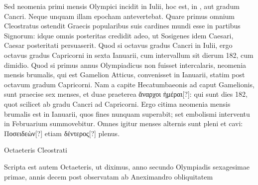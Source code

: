 Sed neomenia
primi mensis Olympici incidit in  Iulii, hoc est,
 in , aut
 gradum Cancri.
Neque unquam illam epocham antevertebat.
Quare primus omnium Cleostratus ostendit Graecis popularibus suis
cardines mundi esse in  partibus Signorum: idque omnis posteritas
credidit adeo, ut Sosigenes idem Caesari, Caesar posteritati persuaserit.
Quod si octavus gradus Cancri in  Iulii, ergo octavus gradus
Capricorni in sexta Ianuarii, cum intervallum sit dierum 182, cum
dimidio.
Quod si primus annus Olympiadicus non fuisset intercalaris,
neomenia mensis brumalis, qui est Gamelion Atticus, convenisset
in  Ianuarii, statim post octavum gradum Capricorni.
Nam a capite
Hecatumbaeonis ad caput Gamelionis, sunt praecise sex menses, et
duae praeterea \textgreek{ἄναρχοι ἡμέραι[?]}:
 qui sunt dies 182, quot scilicet ab  gradu
Cancri ad  Capricorni.
Ergo citima neomenia mensis brumalis
est in  Ianuarii, quos fines nunquam superabit; set embolismi
interventu in Februarium summovebitur.
Omnes igitur menses
alternis sunt pleni et cavi: \textgreek{Ποσειδεὼν[?]}
 etiam \textgreek{δέντερος[?]} plenus.
%
\begin{table}[htbp]
 \centering
 \renewcommand{\arraystretch}{1.3}
 
 \caption{Octaeteris Cleostrati}
 \label{tab:octaeteris_cleostrati}
\end{table}
%
Scripta est
autem Octaeteris, ut diximus, anno secundo Olympiadis sexagesimae
primae, annis decem post observatam ab Aneximandro obliquitatem
